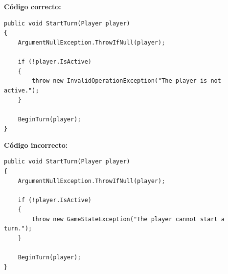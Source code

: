\textbf{Código correcto:}
\begin{lstlisting}[style=csharpstyle]
public void StartTurn(Player player)
{
    ArgumentNullException.ThrowIfNull(player);

    if (!player.IsActive)
    {
        throw new InvalidOperationException("The player is not active.");
    }

    BeginTurn(player);
}
\end{lstlisting}

\textbf{Código incorrecto:}
\begin{lstlisting}[style=csharpstyle]
public void StartTurn(Player player)
{
    ArgumentNullException.ThrowIfNull(player);

    if (!player.IsActive)
    {
        throw new GameStateException("The player cannot start a turn.");
    }

    BeginTurn(player);
}
\end{lstlisting}
